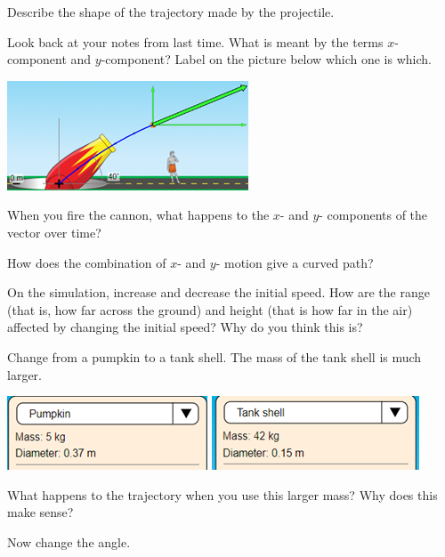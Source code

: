\documentclass[10pt]{exam}
\begin{document}
\begin{questions}
  \question
    Describe the shape of the trajectory made by the projectile.\vs

  \question
    Look back at your notes from last time.  What is meant by the terms $x$-component and $y$-component?  Label on the picture below which one is which.

    \includegraphics{xy.png}
    \vspace{2em}

  \question
    When you fire the cannon, what happens to the $x$- and $y$- components of the vector over time? \vs
    
    
  \question
    How does the combination of $x$- and $y$- motion give a curved path?  \vs


  \pagebreak
    
  \question
    On the simulation, increase and decrease the initial speed. How are the range (that is, how far across the ground) and height (that is how far in the air) affected by changing the initial speed? Why do you think this is? \vs
    
  \question
    Change from a pumpkin to a tank shell.  The mass of the tank shell is much larger.  

    \includegraphics{pumpkin.png} \includegraphics{tankshell.png}
      
    What happens to the trajectory when you use this larger mass?  Why does this make sense? \vs[2]
    
   \question
    Now change the angle.
    
\end{questions}
\end{document}
